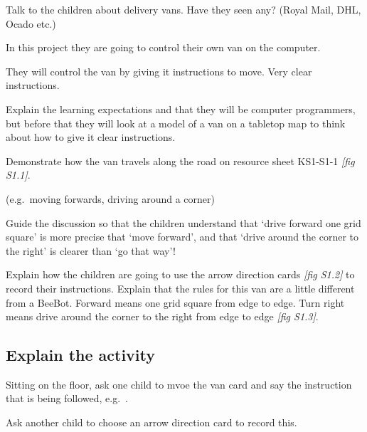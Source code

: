 \documentclass{../../../lessonplan}
\begin{document}
\begin{lessonplan}

Talk to the children about delivery vans.
Have they seen any? (Royal Mail, DHL, Ocado etc.)

In this project they are going to control their own van on the computer.

They will control the van by giving it instructions to move.
Very clear instructions.

Explain the learning expectations and that they will be computer programmers, but before that they will look at a model of a van on a tabletop map to think about how to give it clear instructions.

Demonstrate how the van travels along the road on resource sheet KS1-S1-1 \textit{[fig S1.1]}.


 (e.g.\ moving forwards, driving around a corner)



Guide the discussion so that the children understand that `drive forward one grid square' is more precise that `move forward', and that `drive around the corner to the right' is clearer than `go that way'!


Explain how the children are going to use the arrow direction cards \textit{[fig S1.2]} to record their instructions.
Explain that the rules for this van are a little different from a BeeBot.
Forward means one grid square from edge to edge.
Turn right means drive around the corner to the right from edge to edge \textit{[fig S1.3]}.




\subsection*{Explain the activity}

Sitting on the floor, ask one child to mvoe the van card and say the instruction that is being followed, e.g.\ .

Ask another child to choose an arrow direction card to record this.


\end{lessonplan}
\end{document}
